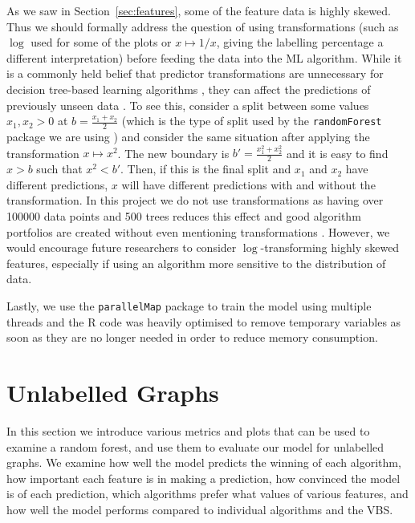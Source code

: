 \documentclass{l4proj}
\theoremstyle{definition}
\theoremstyle{remark}
\begin{document}
As we saw in Section~\ref{sec:features}, some of the feature data is highly
skewed. Thus we should formally address the question of using transformations
(such as $\log$ used for some of the plots or $x \mapsto 1/x$, giving
the labelling percentage a different interpretation) before feeding the
data into the ML algorithm. While it is a commonly held belief that
predictor transformations are unnecessary for decision tree-based learning
algorithms \cite{DBLP:journals/classification/Friedman06,
  DBLP:books/lib/HastieTF09, cart}, they can affect the predictions of
previously unseen data \cite{DBLP:journals/corr/GaliliM16}. To see this,
consider a split between some values $x_1, x_2 > 0$ at $b =
\frac{x_1+x_2}{2}$ (which is the type of split used by the
\texttt{randomForest} package we are using
\cite{DBLP:journals/corr/GaliliM16}) and consider the same situation after
applying the transformation $x \mapsto x^2$. The new boundary is $b' =
\frac{x_1^2+x_2^2}{2}$ and it is easy to find $x > b$ such that $x^2 < b'$.
Then, if this is the final split and $x_1$ and $x_2$ have different predictions,
$x$ will have different predictions with and without the transformation. In
this project we do not use transformations as having over \num{100000} data
points and 500 trees reduces this effect and good algorithm portfolios are
created without even mentioning transformations
\cite{DBLP:conf/lion/KotthoffKHT15, DBLP:conf/lion/KotthoffMS16}. However, we
would encourage future researchers to consider $\log$-transforming highly skewed
features, especially if using an algorithm more sensitive to the distribution of
data.

Lastly, we use the \texttt{parallelMap} package to train the model using
multiple threads and the R code was heavily optimised to remove temporary
variables as soon as they are no longer needed in order to reduce memory
consumption. 

\section{Unlabelled Graphs}

In this section we introduce various metrics and plots that can be used to
examine a random forest, and use them to evaluate our model for unlabelled
graphs. We examine how well the model predicts the winning of each algorithm,
how important each feature is in making a prediction, how convinced the model is
of each prediction, which algorithms prefer what values of various features, and
how well the model performs compared to individual algorithms and the VBS.
\end{document}
